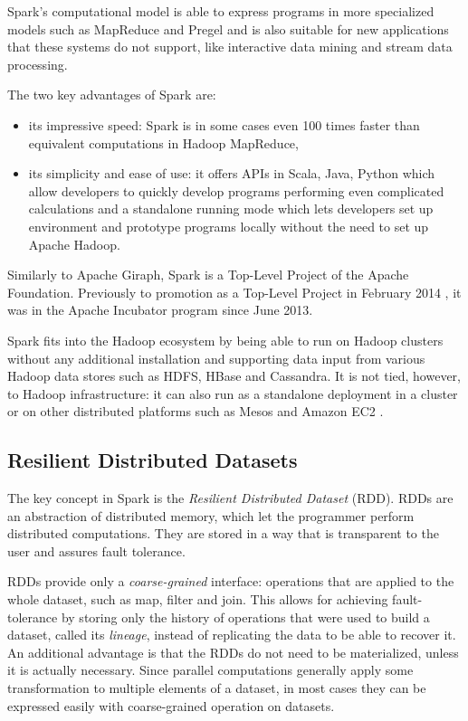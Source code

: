 Spark's computational model is able to express programs in more specialized models such as MapReduce and Pregel and is also suitable for new applications that these systems do not support, like interactive data mining and stream data processing.

The two key advantages of Spark are:
\begin{itemize}
\item its impressive speed: Spark is in some cases even 100 times faster than equivalent computations in Hadoop MapReduce,
\item its simplicity and ease of use: it offers  APIs in Scala, Java, Python which allow developers to quickly develop programs performing even complicated calculations and a standalone running mode which lets developers set up environment and prototype programs locally without the need to set up Apache Hadoop.
\end{itemize}

Similarly to Apache Giraph, Spark is a Top-Level Project of the Apache Foundation. Previously to promotion as a Top-Level Project in February 2014 \cite{sparktoplevel}, it was in the Apache Incubator program since June 2013. 

Spark fits into the Hadoop ecosystem by being able to run on Hadoop clusters without any additional installation and supporting data input from various Hadoop data stores such as HDFS, HBase and Cassandra. It is not tied, however, to Hadoop infrastructure: it can also run as a standalone deployment in a cluster or on other distributed platforms such as Mesos \cite{mesos} and Amazon EC2 \cite{ec2}.

\subsection{Resilient Distributed Datasets}
The key concept in Spark is the \emph{Resilient Distributed Dataset} (RDD). RDDs are an abstraction of distributed memory, which let the programmer perform distributed computations. They are stored in a way that is transparent to the user and assures fault tolerance.

RDDs provide only a \emph{coarse-grained} interface: operations that are applied to the whole dataset, such as map, filter and join. This allows for achieving fault-tolerance by storing only the history of operations that were used to build a dataset, called its \emph{lineage}, instead of replicating the data to be able to recover it. An additional advantage is that the RDDs do not need to be materialized, unless it is actually necessary. Since parallel computations generally apply some transformation to multiple elements of a dataset, in most cases they can be expressed easily with coarse-grained operation on datasets.

